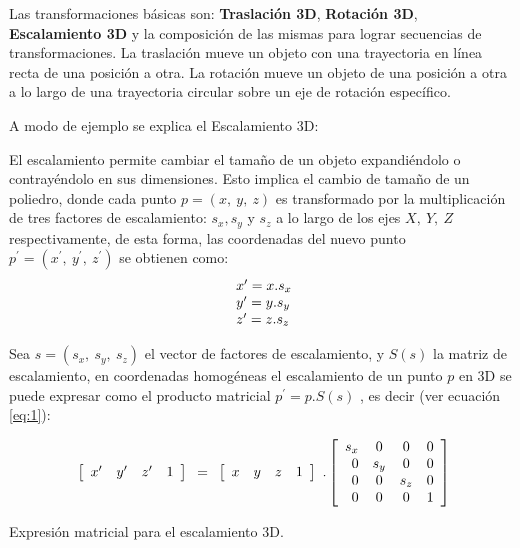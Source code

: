 Las transformaciones básicas son:  \textbf{Traslación  3D}, \textbf{Rotación  3D}, \textbf{Escalamiento  3D} y la composición de las mismas para lograr secuencias de transformaciones.
La traslación mueve un objeto con una trayectoria en línea recta de una posición a otra. La rotación mueve un objeto de una posición a otra a lo largo de una trayectoria circular sobre un eje de rotación específico.


\vspace{5mm}
A modo de ejemplo se explica el Escalamiento 3D:

El escalamiento permite cambiar el tamaño de un objeto expandiéndolo o contrayéndolo en sus dimensiones. %
Esto implica el cambio de tamaño de un poliedro, donde cada punto $p = (x,\ y,\ z)$ es transformado por la multiplicación de tres factores de escalamiento: $s_{x}, s_{y}$ y $s_{z}$ a lo largo de los ejes $X,\ Y,\ Z$ respectivamente, de esta forma, las coordenadas del nuevo punto $p^{\prime} = ({x}^{ \prime},\ {y}^{ \prime},\ {z}^{ \prime})$ se obtienen como:
$$
\begin{array}{l@{}l}
{x}^{\prime} = x.s_{x}
\\
{y}^{\prime} = y.s_{y}
\\
{z}^{\prime} = z.s_{z}
\end{array}
$$


Sea $s = (s_{x},\ s_{y},\ s_{z})$ el vector de factores de escalamiento, y $S(s)$ la matriz de
escalamiento, en coordenadas homogéneas \citep{santalo1966geometria} el escalamiento de un punto $p$ en 3D se puede expresar como el producto matricial
$p^{\prime} = p.S(s)$ , es decir (ver ecuación \ref{eq:1}):

\begin{equation}
\begin{array}{rccl}
\left[
\begin{array}{rccl}
{x}^{\prime} & {y}^{\prime} & {z}^{\prime} & 1\\
\end{array}
\right]
\end{array}
=
\begin{array}{rccl}
\left[
\begin{array}{rccl}
x & y & z & 1\newline
\end{array}
\right]
\end{array} 
.
\left[
\begin{array}{rccl}
s_{x} & 0 & 0 & 0\\
0 & s_{y} & 0 & 0\\
0 & 0 & s_{z} & 0\\
0 & 0 & 0 & 1\\
\end{array}
\right]   
\label{eq:1}
\end{equation}
\begin{center}
\footnotesize{Expresión matricial para el escalamiento 3D.}
\end{center}

